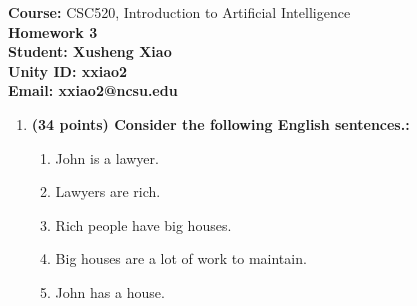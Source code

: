\documentclass{article}%
\begin{document}
\begin{flushleft}
\textbf{Course:} CSC520, Introduction to Artificial Intelligence\\
\textbf{Homework 3}\\
\textbf{Student: Xusheng Xiao} \\
\textbf{Unity ID: xxiao2} \\
\textbf{Email: xxiao2@ncsu.edu}
\end{flushleft}

\noindent{\hrulefill}

\bigskip

\begin{enumerate}
	\item \textbf{ (34 points) Consider the following English sentences.:}
	\begin{enumerate}
	\item John is a lawyer.
    \item Lawyers are rich.
    \item Rich people have big houses.
    \item Big houses are a lot of work to maintain.
    \item John has a house.
	\end{enumerate}
     

\end{enumerate}
\end{document}
